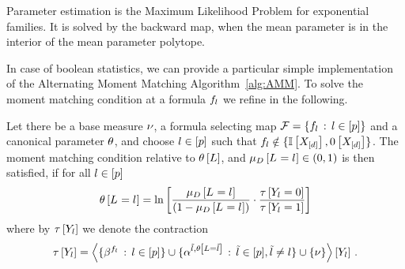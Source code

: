 \label{sec:alternatingParEstMLN}

Parameter estimation is the Maximum Likelihood Problem for exponential families.
It is solved by the backward map, when the mean parameter is in the interior of the mean parameter polytope.

\subsect{\MarkovLogicNetworks{}}

In case of boolean statistics, we can provide a particular simple implementation of the Alternating Moment Matching Algorithm~\ref{alg:AMM}.
To solve the moment matching condition at a formula $f_{l}$ we refine  in the following.

\begin{lemma}
    \label{ref:lemMMinMLN}
    Let there be a base measure $\nu$, a formula selecting map $\mathcal{F}=\{f_{l} \, : \, l\in[p]\}$ and a canonical parameter $\theta$, and choose $l\in[p]$ such that $f_{l}  \notin \{\mathbb{I}\left[X_{[d]}\right],0\left[X_{[d]}\right]\}$.
    The moment matching condition relative to $\theta\left[L\right]$, and $\mu_{D}\left[L_{}=l_{}\right]\in(0,1)$ is then satisfied, if for all $l\in[p]$
    \begin{align}
        \label{sol:momentMatchingExformula}
        \theta\left[L_{}=l_{}\right] = \ln \left[ 
            \frac{\mu_{D}\left[L_{}=l_{}\right]}{(1-\mu_{D}\left[L_{}=l_{}\right])}
            \cdot \frac{\tau\left[Y_{l}=0\right]}{\tau\left[Y_{l}=1\right]}
         \right]
    \end{align}
    where by $\tau\left[Y_{l}\right]$ we denote the contraction
    \begin{align*}
        \tau\left[Y_{l}\right]
        = \left\langle \{\beta^{f_{l}} \,:\, l\in[p]\}
        \cup\{\alpha^{\tilde{l},\theta\left[L=\tilde{l}\right]} \,:\, \tilde{l} \in [p], \tilde{l}\neq l\}
        \cup\{\nu\}\right\rangle \left[ Y_{l} \right] \, .
    \end{align*}
\end{lemma}
